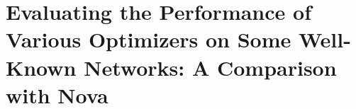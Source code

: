 \documentclass{article}
\begin{document}
%
%
%
%
%
%




%
%
%



\section{Evaluating the Performance of Various Optimizers on Some Well-Known Networks: A Comparison
with Nova}\label{Sec 3}
\end{document}
